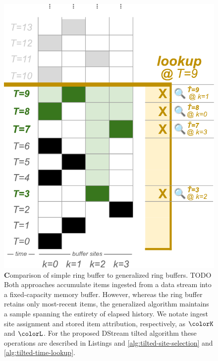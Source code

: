 \begin{figure}
{{\begin{minipage}{0.6\linewidth}
\includegraphics[width=\linewidth]{img/ring-buffer-tilted}
\vspace{1ex}
\end{minipage}%
}%
}
\endgroup

\caption{
  {\textbf Comparison of simple ring buffer to generalized ring buffers.}
  \footnotesize
  TODO
  Both approaches accumulate items ingested from a data stream into a fixed-capacity memory buffer.
  However, whereas the ring buffer retains only most-recent items, the generalized algorithm maintains a sample spanning the entirety of elapsed history.
  We notate ingest site assignment and stored item attribution, respectively, as $\colorK$ and $\colorL$.
  For the proposed DStream tilted algorithm these operations are described in Listings and \ref{alg:tilted-site-selection} and \ref{alg:tilted-time-lookup}.
}
\label{fig:curation-ingest-lookup}
\end{figure}
